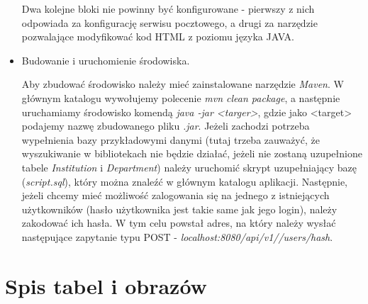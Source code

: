 \documentclass{report}
\begin{document}
\begin{itemize}
		Dwa kolejne bloki nie powinny być konfigurowane - pierwszy z nich odpowiada za konfigurację serwisu pocztowego, a drugi za narzędzie pozwalające modyfikować kod HTML z poziomu języka JAVA.
		
	\item Budowanie i uruchomienie środowiska.
	
	Aby zbudować środowisko należy mieć zainstalowane narzędzie \textit{Maven}. W głównym katalogu wywołujemy polecenie \textit{mvn clean package}, a następnie uruchamiamy środowisko komendą \textit{java -jar <targer>}, gdzie jako <target> podajemy nazwę zbudowanego pliku \textit{.jar}. Jeżeli zachodzi potrzeba wypełnienia bazy przykładowymi danymi (tutaj trzeba zauważyć, że wyszukiwanie w bibliotekach nie będzie działać, jeżeli nie zostaną uzupełnione tabele \textit{Institution} i \textit{Department}) należy uruchomić skrypt uzupełniający bazę (\textit{script.sql}), który można znaleźć w głównym katalogu aplikacji. Następnie, jeżeli chcemy mieć możliwość zalogowania się na jednego z istniejących użytkowników (hasło użytkownika jest takie same jak jego login), należy zakodować ich hasła. W tym celu powstał adres, na który należy wysłać następujące zapytanie typu POST - \textit{localhost:8080/api/v1//users/hash}.
		
		
		

	
	
	
	

\end{itemize}

\chapter{Spis tabel i obrazów}


\begingroup
\let\clearpage\relax
\listoffigures
\listoftables
\endgroup
\end{document}
